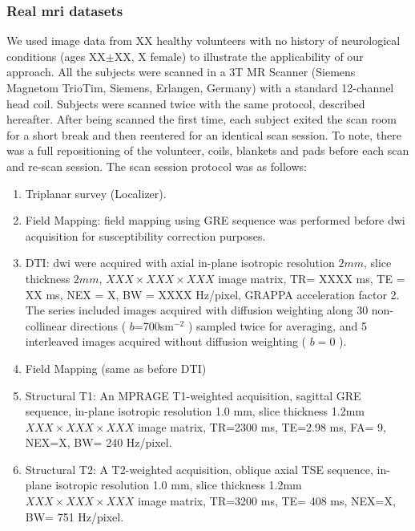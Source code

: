 \subsubsection{Real \gls{mri} datasets} %
%
We used image data from XX healthy volunteers with no history of neurological
conditions (ages XX$\pm$XX, X female) to illustrate the applicability of our 
approach. All the subjects were scanned in a 3T MR Scanner (Siemens Magnetom
TrioTim, Siemens, Erlangen, Germany) with a standard 12-channel head coil. 
Subjects were scanned twice with the same protocol,
described hereafter. After being scanned the first time, each subject exited the
scan room for a short break and then reentered for an identical scan session.
To note, there was a full repositioning of the volunteer, coils, blankets and pads
before each scan and re-scan session. The scan session protocol was as follows:
\begin{enumerate}
\item Triplanar survey (Localizer).
\item Field Mapping: field mapping using GRE sequence was performed before \gls{dwi}
acquisition for susceptibility correction purposes.
\item DTI: \gls{dwi} were acquired with axial in-plane 
isotropic resolution $2mm$, slice thickness $2mm$, $XXX \times XXX \times XXX$ 
image matrix, TR= XXXX ms, TE = XX ms, NEX = X, BW = XXXX Hz/pixel, GRAPPA
acceleration factor 2. The series included images acquired with diffusion
weighting along 30 non-collinear directions ( $b$=700sm$^{-2}$ ) sampled
twice for averaging, and 5 interleaved images acquired without diffusion 
weighting ( $b=0$ ).
\item Field Mapping (same as before DTI)
\item Structural T1: An MPRAGE T1-weighted acquisition, sagittal
GRE sequence, in-plane isotropic resolution 1.0 mm, slice thickness 1.2mm
$XXX \times XXX \times XXX$ image matrix, TR=2300 ms, TE=2.98 ms, FA= 9, NEX=X, BW= 240 Hz/pixel.
\item Structural T2: A T2-weighted acquisition, oblique axial
TSE sequence, in-plane isotropic resolution 1.0 mm, slice thickness 1.2mm
$XXX \times XXX \times XXX$ image matrix, TR=3200 ms, TE= 408 ms, NEX=X, BW= 751 Hz/pixel.
\end{enumerate}


